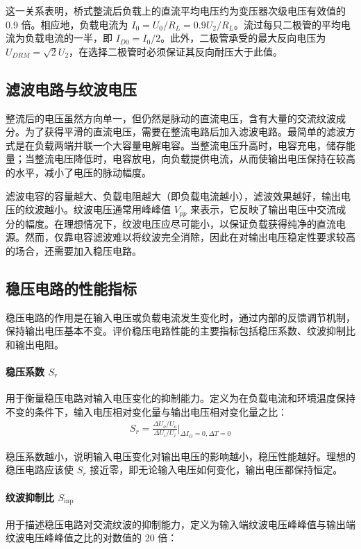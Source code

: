 ﻿\documentclass[12pt,a4paper]{article}
\begin{document}
这一关系表明，桥式整流后负载上的直流平均电压约为变压器次级电压有效值的 0.9 倍。相应地，负载电流为 $I_0 = U_0 / R_L = 0.9 U_2 / R_L$。流过每只二极管的平均电流为负载电流的一半，即 $I_{D0} = I_0 / 2$。此外，二极管承受的最大反向电压为 $U_{DRM} = \sqrt{2} U_2$，在选择二极管时必须保证其反向耐压大于此值。

\subsection{滤波电路与纹波电压}

整流后的电压虽然方向单一，但仍然是脉动的直流电压，含有大量的交流纹波成分。为了获得平滑的直流电压，需要在整流电路后加入滤波电路。最简单的滤波方式是在负载两端并联一个大容量电解电容。当整流电压升高时，电容充电，储存能量；当整流电压降低时，电容放电，向负载提供电流，从而使输出电压保持在较高的水平，减小了电压的脉动幅度。

滤波电容的容量越大、负载电阻越大（即负载电流越小），滤波效果越好，输出电压的纹波越小。纹波电压通常用峰峰值 $V_{pp}$ 来表示，它反映了输出电压中交流成分的幅度。在理想情况下，纹波电压应尽可能小，以保证负载获得纯净的直流电源。然而，仅靠电容滤波难以将纹波完全消除，因此在对输出电压稳定性要求较高的场合，还需要加入稳压电路。

\subsection{稳压电路的性能指标}

稳压电路的作用是在输入电压或负载电流发生变化时，通过内部的反馈调节机制，保持输出电压基本不变。评价稳压电路性能的主要指标包括稳压系数、纹波抑制比和输出电阻。

\paragraph{稳压系数 $S_r$}
用于衡量稳压电路对输入电压变化的抑制能力。定义为在负载电流和环境温度保持不变的条件下，输入电压相对变化量与输出电压相对变化量之比：
\begin{align}
S_r = \frac{\Delta U_o / U_o}{\Delta U_i / U_i} \bigg|_{\Delta I_O = 0, \Delta T = 0}
\end{align}

稳压系数越小，说明输入电压变化对输出电压的影响越小，稳压性能越好。理想的稳压电路应该使 $S_r$ 接近零，即无论输入电压如何变化，输出电压都保持恒定。

\paragraph{纹波抑制比 $S_{\text{inp}}$}
用于描述稳压电路对交流纹波的抑制能力，定义为输入端纹波电压峰峰值与输出端纹波电压峰峰值之比的对数值的 20 倍：
\end{document}
